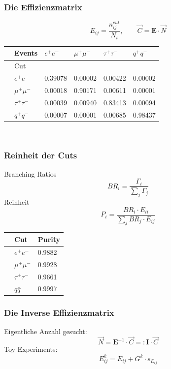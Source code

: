 \begin{frame}
	\frametitle{Die Effizienzmatrix}
	\begin{equation*}
	E_{ij}=\frac{n^{cut}_{ij}}{N_i},\qquad \vec{C}=\boldsymbol{E}\cdot\vec{N}
	\end{equation*}
	\begin{table}[H]\centering
		\begin{tabular}{@{}llllll@{}}
			\toprule
			&Events &$e^+e^-$&$\mu^+\mu^-$&$\tau^+\tau^-$&$q^+q^-$\\
			\midrule
			&Cut&&&&\\
			&$e^+e^-$&0.39078&0.00002&0.00422&0.00002\\
			&$\mu^+\mu^-$&0.00018&0.90171&0.00611&0.00001\\
			&$\tau^+\tau^-$&0.00039&0.00940&0.83413&0.00094\\
			&$q^+q^-$&0.00007&0.00001&0.00685&0.98437\\
		\end{tabular}\\
		\noindent{}
	\end{table}
\end{frame}

\begin{frame}
	\frametitle{Reinheit der Cuts}
	\hspace{2cm} Branching Ratios
	\begin{equation*}
		BR_i=\frac{\Gamma_i}{\sum_{j}\Gamma_{j}}
	\end{equation*}
	\hspace{2cm} Reinheit
	\begin{equation*}
		P_i=\frac{BR_i\cdot E_{ii}}{\sum_{j}BR_j\cdot E_{ij}}
	\end{equation*}
	\begin{table}\centering
		\begin{tabular}{@{}lll@{}}
			\toprule
			&Cut&Purity\\
			\midrule
			&$e^+e^-$&0.9882\\
			&$\mu^+\mu^-$&0.9928\\
			&$\tau^+\tau^-$&0.9661\\
			&$q\overline{q}$&0.9997\\
			\bottomrule
		\end{tabular}
	\end{table}
\end{frame}

\begingroup
\Large
\begin{frame}
	\frametitle{Die Inverse Effizienzmatrix}
	\hspace{2cm} Eigentliche Anzahl gesucht:
	\begin{equation*}
		\vec{N}=\boldsymbol{E}^{-1}\cdot\vec{C}=:\boldsymbol{I}\cdot\vec{C}
	\end{equation*}
	\hspace{2cm} Toy Experiments:
	\begin{equation*}
		E^{k}_{ij}=E_{ij}+G^k\cdot s_{E_{ij}}
	\end{equation*}
\end{frame}
\endgroup

